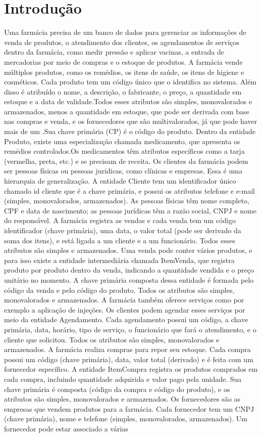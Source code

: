 \documentclass{article}
\begin{document}
\section{Introdução}
Uma farmácia precisa de um banco de dados para gerenciar as informações de venda de produtos, o atendimento dos clientes, os agendamentos de serviços dentro da farmácia, como medir pressão e aplicar vacinas, a entrada de mercadorias por meio de compras e o estoque de produtos. A farmácia vende múltiplos produtos, como os remédios, os itens de saúde, os itens de higiene e cosméticos. Cada produto tem um código único que o identifica no sistema.  Além disso é atribuído o nome, a descrição, o fabricante, o preço, a quantidade em estoque e a data de validade.Todos esses atributos são simples, monovalorados e armazenados, menos a quantidade em estoque, que pode ser derivada com base nas compras e venda, e os fornecedores que são multivalorados, já que pode haver mais de um .Sua chave primária (CP) é o código do produto. Dentro da entidade Produto, existe uma especialização chamada medicamento, que apresenta os remédios controlados.Os medicamentos têm atributos específicos como a tarja (vermelha, preta, etc.) e se precisam de receita. Os clientes da farmácia podem ser pessoas físicas ou pessoas jurídicas, como clínicas e empresas. Essa é uma hierarquia de generalização. A entidade Cliente tem um identificador único chamado id cliente que é a chave primária, e possui os atributos telefone e e-mail (simples, monovalorados, armazenados). As pessoas físicas têm nome completo, CPF e data de nascimento; as pessoas jurídicas têm a razão social, CNPJ e nome do responsável. A farmácia registra as vendas e cada venda tem um código identificador (chave primária), uma data, o valor total (pode ser derivado da soma dos itens), e está ligada a um cliente e a um funcionário. Todos esses atributos são simples e armazenados. Uma venda pode conter vários produtos, e para isso existe a entidade intermediária chamada ItemVenda, que registra produto por produto dentro da venda, indicando a quantidade vendida e o preço unitário no momento. A chave primária composta dessa entidade é formada pelo código da venda e pelo código do produto. Todos os atributos são simples, monovalorados e armazenados. A farmácia também oferece serviços como por exemplo a aplicação de injeções. Os clientes podem agendar esses serviços por meio da entidade Agendamento. Cada agendamento possui um código, a chave primária, data, horário, tipo de serviço, o funcionário que fará o atendimento, e o cliente que solicitou. Todos os atributos são simples, monovalorados e armazenados. A farmácia realiza compras para repor seu estoque. Cada compra possui um código (chave primária), data, valor total (derivado) e é feita com um fornecedor específico. A entidade ItemCompra registra os produtos comprados em cada compra, incluindo quantidade adquirida e valor pago pela unidade. Sua chave primária é composta (código da compra e código do produto), e os atributos são simples, monovalorados e armazenados. Os fornecedores são as empresas que vendem produtos para a farmácia. Cada fornecedor tem um CNPJ (chave primária), nome e telefone (simples, monovalorados, armazenados). Um fornecedor pode estar associado a várias 
\end{document}

